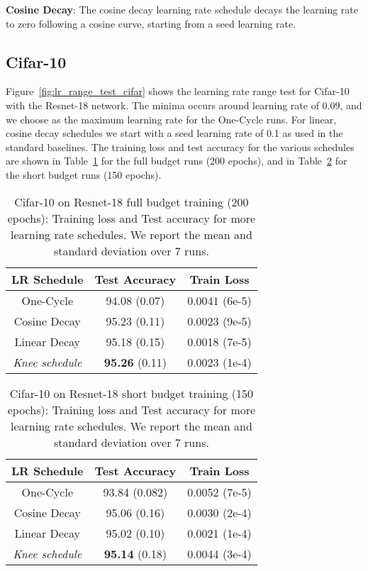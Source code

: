 \documentclass[twoside,11pt]{article}
\newcommand{\lrschedule}{\textit{Knee schedule}}
\begin{document}
\textbf{Cosine Decay}: The cosine decay learning rate schedule decays the learning rate to zero following a cosine curve, starting from a seed learning rate.

\subsection{Cifar-10}
Figure~\ref{fig:lr_range_test_cifar}  shows the learning rate range test for Cifar-10 with the Resnet-18 network. The minima occurs around learning rate of 0.09, and we choose  as the maximum learning rate for the One-Cycle runs. For linear, cosine decay schedules we start with a seed learning rate of 0.1 as used in the standard baselines. The training loss and test accuracy for the various schedules are shown in Table~\ref{tab:cifar_results_extra_baselines_full_budget} for the full budget runs (200 epochs), and in Table~\ref{tab:cifar_results_extra_baselines_short_budget} for the short budget runs (150 epochs).

\begin{table}[h!]
\small
\centering
\caption{Cifar-10 on Resnet-18 full budget training (200 epochs): Training loss and Test accuracy for more learning rate schedules. We report the mean and standard deviation over 7 runs.}
\label{tab:cifar_results_extra_baselines_full_budget}

\begin{tabular}{ccc}
  \toprule
  LR Schedule     & Test Accuracy  & Train Loss \\ 
  \midrule
  One-Cycle       & 94.08 (0.07)  & 0.0041 (6e-5) \\
  Cosine Decay    & 95.23 (0.11) & 0.0023 (9e-5)  \\
  Linear Decay    & 95.18 (0.15) & 0.0018 (7e-5)  \\
  \lrschedule{}   & \textbf{95.26} (0.11) & 0.0023 (1e-4)  \\ 
\bottomrule
\end{tabular}

\end{table}

\begin{table}[h!]
\small
\centering
\caption{Cifar-10 on Resnet-18 short budget training (150 epochs): Training loss and Test accuracy for more learning rate schedules. We report the mean and standard deviation over 7 runs.}
\label{tab:cifar_results_extra_baselines_short_budget}

\begin{tabular}{ccc}
  \toprule
  LR Schedule   & Test Accuracy   & Train Loss  \\ 
  \midrule
  One-Cycle     & 93.84 (0.082)    & 0.0052 (7e-5)   \\
  Cosine Decay   & 95.06 (0.16)    & 0.0030 (2e-4)\\
  Linear Decay    & 95.02 (0.10)  & 0.0021 (1e-4) \\
  \lrschedule{}   & \textbf{95.14} (0.18) & 0.0044 (3e-4)  \\ 
  \bottomrule
\end{tabular}

\end{table}
\end{document}
